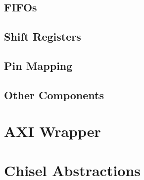 \subsection{FIFOs}

\subsection{Shift Registers}

\subsection{Pin Mapping}

\subsection{Other Components}

\section{AXI Wrapper}

\section{Chisel Abstractions}